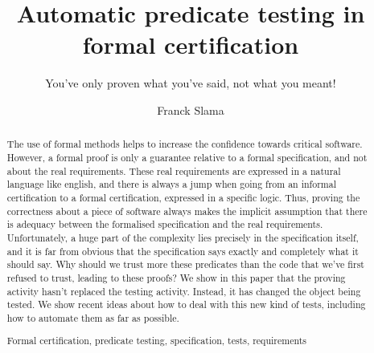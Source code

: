 \documentclass[runningheads,a4paper]{llncs}
\newcommand{\keywords}[1]{\par\addvspace\baselineskip
\noindent\keywordname\enspace\ignorespaces#1}
\begin{document}
\mainmatter  %

\title{Automatic predicate testing in formal certification}
\subtitle{You've only proven what you've said, not what you meant!}



\author{Franck Slama\\
         }


\maketitle


\begin{abstract}
The use of formal methods helps to increase the confidence towards critical software. However, a formal proof is only a guarantee relative to a formal specification, and not about the real requirements. These real requirements are expressed in a natural language like english, and there is always a jump when going from an informal certification to a formal certification, expressed in a specific logic. Thus, proving the correctness about a piece of software always makes the implicit assumption that there is adequacy between the formalised specification and the real requirements. Unfortunately, a huge part of the complexity lies precisely in the specification itself, and it is far from obvious that the specification says exactly and completely what it should say. Why should we trust more these predicates than the code that we've first refused to trust, leading to these proofs? We show in this paper that the proving activity hasn't replaced the testing activity. Instead, it has changed the object being tested. We show recent ideas about how to deal with this new kind of tests, including how to automate them as far as possible.
\keywords{Formal certification, predicate testing, specification, tests, requirements}
\end{abstract}



\end{document}

